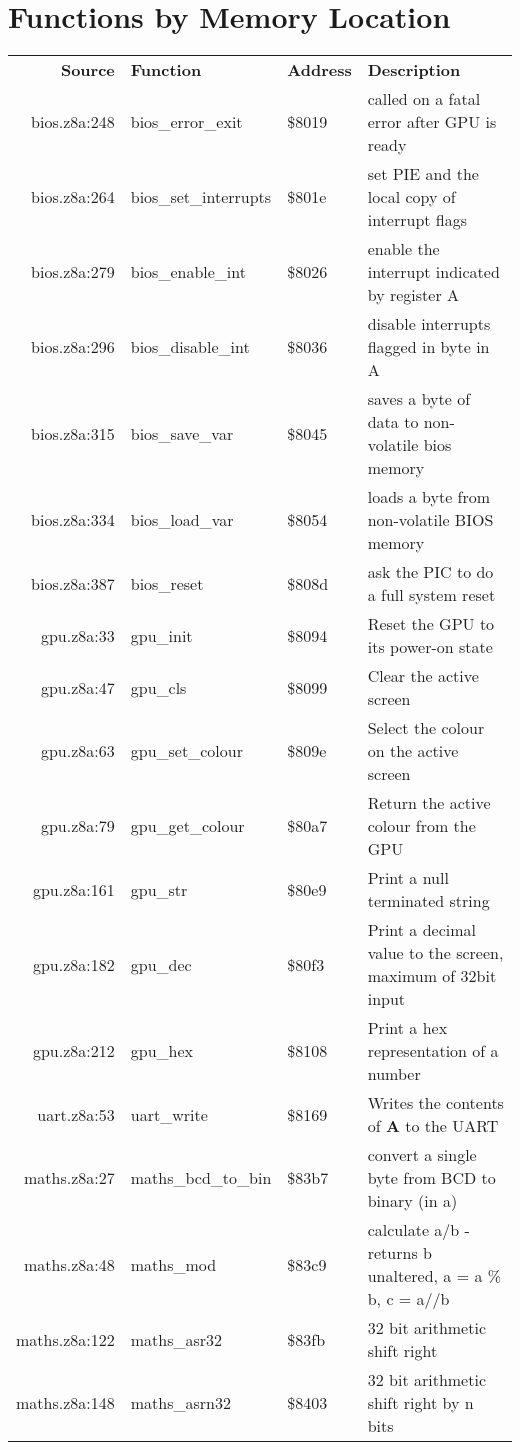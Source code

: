 \section{Functions by Memory Location}
\begin{tabular}{rllp{7cm}}
 \textbf{Source}&\textbf{Function}&\textbf{Address}&\textbf{Description}\\
 bios.z8a:248&bios\_error\_exit&\$8019&called on a fatal error after GPU is ready\\
 bios.z8a:264&bios\_set\_interrupts&\$801e&set PIE and the local copy of interrupt flags\\
 bios.z8a:279&bios\_enable\_int&\$8026&enable the interrupt indicated by register A\\
 bios.z8a:296&bios\_disable\_int&\$8036&disable interrupts flagged in byte in A\\
 bios.z8a:315&bios\_save\_var&\$8045&saves a byte of data to non-volatile bios memory\\
 bios.z8a:334&bios\_load\_var&\$8054&loads a byte from non-volatile BIOS memory\\
 bios.z8a:387&bios\_reset&\$808d&ask the PIC to do a full system reset\\
 gpu.z8a:33&gpu\_init&\$8094&Reset the GPU to its power-on state\\
 gpu.z8a:47&gpu\_cls&\$8099&Clear the active screen\\
 gpu.z8a:63&gpu\_set\_colour&\$809e&Select the colour on the active screen\\
 gpu.z8a:79&gpu\_get\_colour&\$80a7&Return the active colour from the GPU\\
 gpu.z8a:161&gpu\_str&\$80e9&Print a null terminated string\\
 gpu.z8a:182&gpu\_dec&\$80f3&Print a decimal value to the screen, maximum of 32bit input\\
 gpu.z8a:212&gpu\_hex&\$8108&Print a hex representation of a number\\
 uart.z8a:53&uart\_write&\$8169&Writes the contents of \textbf{A} to the UART\\
 maths.z8a:27&maths\_bcd\_to\_bin&\$83b7&convert a single byte from BCD to binary (in a)\\
 maths.z8a:48&maths\_mod&\$83c9&calculate a/b - returns b unaltered, a = a \% b, c = a//b\\
 maths.z8a:122&maths\_asr32&\$83fb&32 bit arithmetic shift right\\
 maths.z8a:148&maths\_asrn32&\$8403&32 bit arithmetic shift right by n bits\\

\end{tabular}

